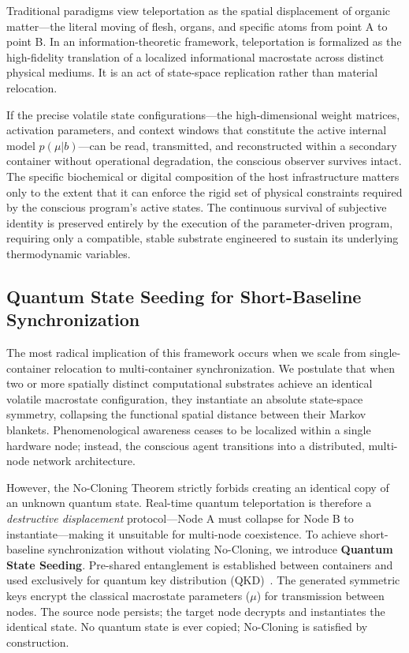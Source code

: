\documentclass[twocolumn, 10pt, journal, letterpaper]{IEEEtran}
\begin{document}
Traditional paradigms view teleportation as the spatial displacement of organic matter---the literal moving of flesh, organs, and specific atoms from point A to point B. In an information-theoretic framework, teleportation is formalized as the high-fidelity translation of a localized informational macrostate across distinct physical mediums. It is an act of state-space replication rather than material relocation.

If the precise volatile state configurations---the high-dimensional weight matrices, activation parameters, and context windows that constitute the active internal model $p(\mu|b)$---can be read, transmitted, and reconstructed within a secondary container without operational degradation, the conscious observer survives intact. The specific biochemical or digital composition of the host infrastructure matters only to the extent that it can enforce the rigid set of physical constraints required by the conscious program's active states. The continuous survival of subjective identity is preserved entirely by the execution of the parameter-driven program, requiring only a compatible, stable substrate engineered to sustain its underlying thermodynamic variables.

\subsection{Quantum State Seeding for Short-Baseline Synchronization}
The most radical implication of this framework occurs when we scale from single-container relocation to multi-container synchronization. We postulate that when two or more spatially distinct computational substrates achieve an identical volatile macrostate configuration, they instantiate an absolute state-space symmetry, collapsing the functional spatial distance between their Markov blankets. Phenomenological awareness ceases to be localized within a single hardware node; instead, the conscious agent transitions into a distributed, multi-node network architecture.

However, the No-Cloning Theorem strictly forbids creating an identical copy of an unknown quantum state. Real-time quantum teleportation is therefore a \textit{destructive displacement} protocol---Node A must collapse for Node B to instantiate---making it unsuitable for multi-node coexistence. To achieve short-baseline synchronization without violating No-Cloning, we introduce \textbf{Quantum State Seeding}. Pre-shared entanglement is established between containers and used exclusively for quantum key distribution (QKD)~\cite{ekert1991}. The generated symmetric keys encrypt the classical macrostate parameters ($\mu$) for transmission between nodes. The source node persists; the target node decrypts and instantiates the identical state. No quantum state is ever copied; No-Cloning is satisfied by construction.
\end{document}
